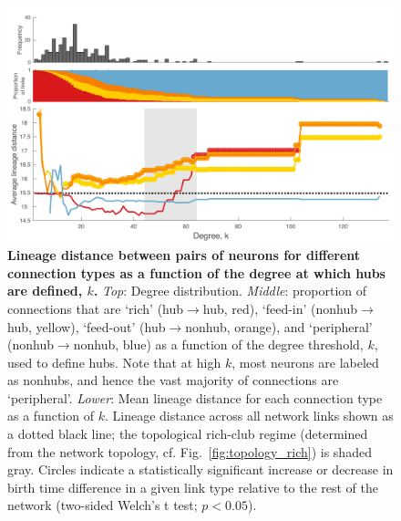 \documentclass[10pt,letterpaper]{article}
\begin{document}
\begin{figure}[!h]
\centering
    \includegraphics[width=1\textwidth]{lineageDistanceRPF.pdf}
    \caption{
    \textbf{Lineage distance between pairs of neurons for different connection types as a function of the degree at which hubs are defined, $k$.}
    \emph{Top}: Degree distribution.
\emph{Middle}: proportion of connections that are `rich' (hub$\rightarrow$hub, red), `feed-in' (nonhub$\rightarrow$hub, yellow), `feed-out' (hub$\rightarrow$nonhub, orange), and `peripheral' (nonhub$\rightarrow$nonhub, blue) as a function of the degree threshold, $k$, used to define hubs.
Note that at high $k$, most neurons are labeled as nonhubs, and hence the vast majority of connections are `peripheral'.
\emph{Lower}: Mean lineage distance for each connection type as a function of $k$.
Lineage distance across all network links shown as a dotted black line; the topological rich-club regime (determined from the network topology, cf. Fig.~\ref{fig:topology_rich}) is shaded gray.
Circles indicate a statistically significant increase or decrease in birth time difference in a given link type relative to the rest of the network (two-sided Welch’s t test; $p < 0.05$).
}
\label{fig:Lineagek}
\end{figure}
\end{document}
